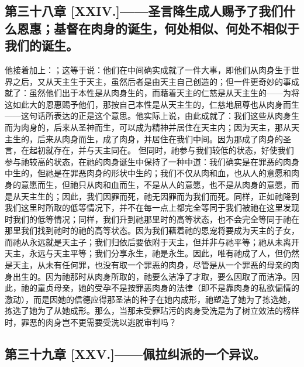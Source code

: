 
\subsection{第三十八章 [XXIV.]——圣言降生成人赐予了我们什么恩惠；基督在肉身的诞生，何处相似、何处不相似于我们的诞生。}

他接着加上：；这等于说：他们在中间确实成就了一件大事，即他们从肉身生于世界之后，又从天主生于天主，虽然后者是由天主自己创造的；但一件更奇妙的事成就了：虽然他们出于本性是从肉身生的，而藉着天主的仁慈是从天主生的——为将这如此大的恩惠赐予他们，那按自己本性是从天主生的，仁慈地屈尊也从肉身而生——这句话所表达的正是这个意思。他实际上说，由此成就了：我们这些从肉身生而为肉身的，后来从圣神而生，可以成为精神并居住在天主内；因为天主，那从天主生的，后来从肉身而生，成了肉身，并居住在我们中间。因为那成了肉身的圣言，在起初就存在，并与天主同在。 但同时，祂参与我们较低的状态，好使我们参与祂较高的状态，在祂的肉身诞生中保持了一种中道：我们确实是在罪恶的肉身中生的，但祂是在罪恶肉身的形状中生的；我们不仅从肉和血，也从人的意愿和肉身的意愿而生，但祂只从肉和血而生，不是从人的意愿，也不是从肉身的意愿，而是从天主生的；因此，我们因罪而死，祂无因罪而为我们而死。同样，正如祂降到我们这里时所取的低等情况下，并不在每一点上都完全等同于我们被祂在这里发现时我们的低等情况；同样，我们升到祂那里时的高等状态，也不会完全等同于祂在那里我们找到祂时的祂的高等状态。因为我们藉着祂的恩宠将要成为天主的子女，而祂从永远就是天主子；我们归依后要依附于天主，但并非与祂平等；祂从未离开天主，永远与天主平等；我们分享永生，祂是永生。因此，唯有祂成了人，但仍然是天主，从未有任何罪，也没有取一个罪恶的肉身，尽管是从一个罪恶的母亲的肉身出生的。因为祂那时从肉身所取的，祂要么洁净了才取，要么因取了而洁净。因此，祂的童贞母亲，她的受孕不是按罪恶肉身的法律（即不是靠肉身的私欲偏情的激动），而是因她的信德应得那圣洁的种子在她内成形，祂塑造了她为了拣选她，拣选了她为了从她成形。那么，当那未受罪玷污的肉身受洗是为了树立效法的榜样时，罪恶的肉身岂不更需要受洗以逃脱审判吗？\par


\subsection{第三十九章 [XXV.]——佩拉纠派的一个异议。}

